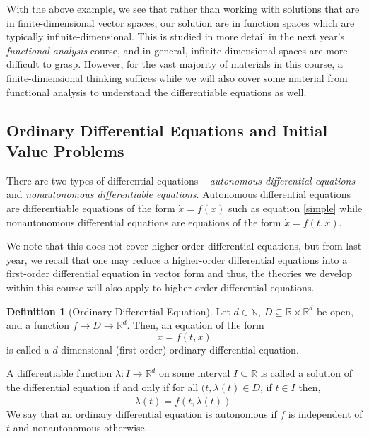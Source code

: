 \documentclass[
]{article}
\theoremstyle{definition}
\theoremstyle{definition}
\newtheorem{definition}{Definition}[section]
\begin{document}
With the above example, we see that rather than working with solutions
that are in finite-dimensional vector spaces, our solution are in
function spaces which are typically infinite-dimensional. This is
studied in more detail in the next year's \emph{functional analysis}
course, and in general, infinite-dimensional spaces are more difficult
to grasp. However, for the vast majority of materials in this course, a
finite-dimensional thinking suffices while we will also cover some
material from functional analysis to understand the differentiable
equations as well.

\hypertarget{ordinary-differential-equations-and-initial-value-problems}{%
\subsection{Ordinary Differential Equations and Initial Value
Problems}\label{ordinary-differential-equations-and-initial-value-problems}}

There are two types of differential equations -- \emph{autonomous
differential equations} and \emph{nonautonomous differentiable
equations}. Autonomous differential equations are differentiable
equations of the form \(\dot x = f(x)\) such as equation \ref{simple}
while nonautonomous differential equations are equations of the form
\(\dot x = f(t, x)\).

We note that this does not cover higher-order differential equations,
but from last year, we recall that one may reduce a higher-order
differential equations into a first-order differential equation in
vector form and thus, the theories we develop within this course will
also apply to higher-order differential equations.

\begin{definition}[Ordinary Differential Equation]
  Let \(d \in \mathbb{N}\), \(D \subseteq \mathbb{R} \times \mathbb{R}^d\) be 
  open, and a function \(f \to D \to \mathbb{R}^d\). Then, an equation of the form 
  \[\dot x = f(t, x)\]
  is called a \(d\)-dimensional (first-order) ordinary differential equation. 

  A differentiable function \(\lambda : I \to \mathbb{R}^d\) on some interval 
  \(I \subseteq \mathbb{R}\) is called a solution of the differential equation 
  if and only if for all \((t, \lambda(t) \in D\), if \(t \in I\) then, 
  \[\dot \lambda(t) = f(t, \lambda(t)).\]
  We say that an ordinary differential equation is autonomous if \(f\) is 
  independent of \(t\) and nonautonomous otherwise.
\end{definition}
\end{document}
